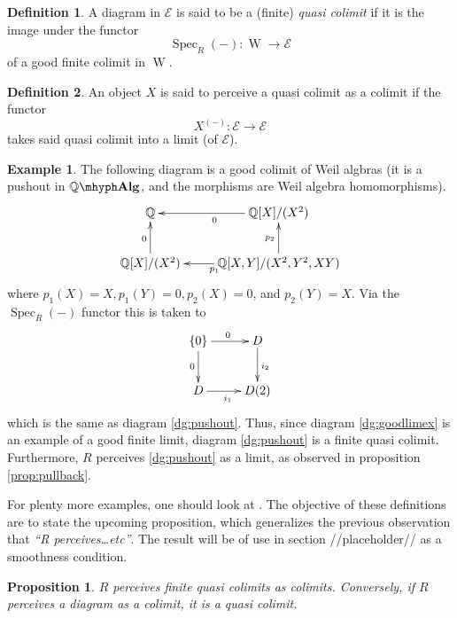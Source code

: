 \documentclass[11pt]{article}
\newtheorem{proposition}{Proposition}[section]
\theoremstyle{definition}
\newtheorem{defn}{Definition}[section]
\newtheorem{exmp}{Example}[defn]
\newcommand{\farg}{-} %
\newcommand{\sdgE}{\mathcal{E}}
\newcommand{\Q}{\mathbb{Q}}
\newcommand{\qalg}{\Q\mhyph\mathbf{Alg}}
\newcommand{\walg}{\operatorname W}
\DeclareMathOperator{\spec}{Spec}
\numberwithin{equation}{section}
\begin{document}
\begin{defn}
  A diagram in \( \sdgE \) is said to be a (finite) \emph{quasi colimit} if it is the image under the functor
  \begin{equation*}
    \spec_R(\farg):\walg\to\sdgE
  \end{equation*}
  of a good finite colimit in \( \walg \).
\end{defn}

\begin{defn}
  An object \( X \) is said to perceive a quasi colimit as a colimit if the functor
  \begin{equation*}
    X^{(\farg)}:\sdgE\to\sdgE
  \end{equation*}
  takes said quasi colimit into a limit (of \( \sdgE \)).
\end{defn}

\begin{exmp}
  The following diagram is a good colimit of Weil algbras (it is a pushout in \( \qalg \), and the morphisms are Weil algebra homomorphisms).
  \begin{equation}
    \xymatrix{
      {\Q}                   & {\Q[X]/(X^2)} \ar[l]^0 \\
      {\Q[X]/(X^2)} \ar[u]^0 & {\Q[X,Y]/(X^2,Y^2,XY)} \ar[u]^{p_2} \ar[l]^{p_1}
    }
    \label{dg:goodlimex}
  \end{equation}
  where \( p_1(X)=X, p_1(Y)=0, p_2(X)=0 \), and \( p_2(Y)=X \). Via the \( \spec_R(\farg) \) functor this is taken to
  \begin{equation*}
    \xymatrix{
      {\{0\}} \ar[d]_0 \ar[r]^0 & D \ar[d]^{i_2} \\
      D \ar[r]_{i_1}            & D(2)
    } 
  \end{equation*}
  which is the same as diagram \ref{dg:pushout}. Thus, since diagram \ref{dg:goodlimex} is an example of a good finite limit, diagram \ref{dg:pushout} is a finite quasi colimit. Furthermore, \( R \) perceives \ref{dg:pushout} as a limit, as observed in proposition \ref{prop:pullback}.
\end{exmp}

For plenty more examples, one should look at \cite{lav96}. The objective of these definitions are to state the upcoming proposition, which generalizes the previous observation that \emph{``R perceives\dots etc''}. The result will be of use in section {//placeholder//} as a smoothness condition.

\begin{proposition}
  \( R \) perceives finite quasi colimits as colimits. Conversely, if \( R \) perceives a diagram as a colimit, it is a quasi colimit. 
  \label{prop:Rperc}
\end{proposition}

\clearpage


\end{document}

